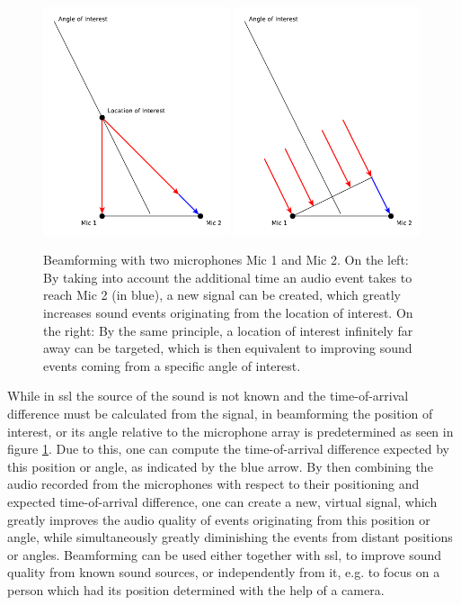 \begin{figure}[]
	\centering
	\includegraphics[width=0.49\textwidth]{diagrams/basics_beamforming.pdf}
	\includegraphics[width=0.49\textwidth]{diagrams/basics_beamforming_2.pdf}
	\caption{Beamforming with two microphones Mic 1 and Mic 2.
		On the left: By taking into account the additional time an audio event takes to reach Mic 2 (in blue), a new signal can be created, which greatly increases sound events originating from the location of interest.
		On the right: By the same principle, a location of interest infinitely far away can be targeted, which is then equivalent to improving sound events coming from a specific angle of interest.}
	\label{pic:basics:beamform}
\end{figure}

While in \gls{ssl} the source of the sound is not known and the time-of-arrival difference must be calculated from the signal, in beamforming the position of interest, or its angle relative to the microphone array is predetermined as seen in figure \ref{pic:basics:beamform}.
Due to this, one can compute the time-of-arrival difference expected by this position or angle, as indicated by the blue arrow.
By then combining the audio recorded from the microphones with respect to their positioning and expected time-of-arrival difference, one can create a new, virtual signal, which greatly improves the audio quality of events originating from this position or angle, while simultaneously greatly diminishing the events from distant positions or angles.
Beamforming can be used either together with \gls{ssl}, to improve sound quality from known sound sources, or independently from it, e.g. to focus on a person which had its position determined with the help of a camera.

